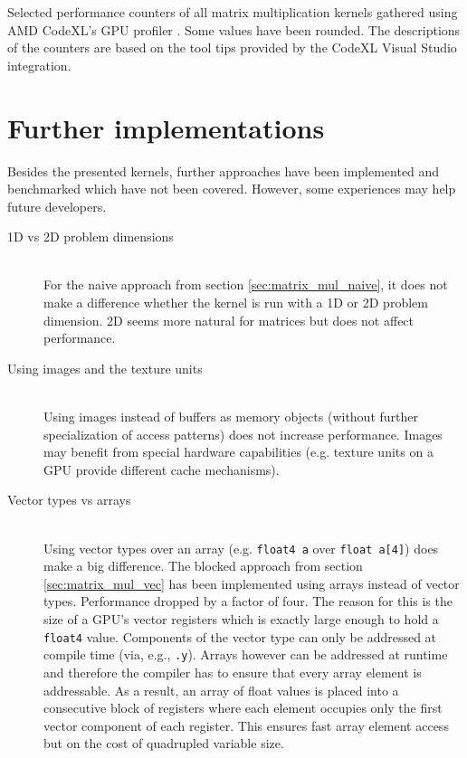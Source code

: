 \begin{table}
	\caption{Selected performance counters of all matrix multiplication kernels gathered using AMD CodeXL's GPU profiler \cite{amd_codexl}. Some values have been rounded. The descriptions of the counters are based on the tool tips provided by the CodeXL Visual Studio integration.}
	\label{tbl:matrix_perf_counter}
\end{table}

\pagebreak

\section{Further implementations}
Besides the presented kernels, further approaches have been implemented and benchmarked which have not been covered. However, some experiences may help future developers.

\begin{description}
	\item[1D vs 2D problem dimensions] \hfill \\
	For the naive approach from section \ref{sec:matrix_mul_naive}, it does not make a difference whether the kernel is run with a 1D or 2D problem dimension. 2D seems more natural for matrices but does not affect performance.

	\item[Using images and the texture units] \hfill \\
	Using images instead of buffers as memory objects (without further specialization of access patterns) does not increase performance. Images may benefit from special hardware capabilities (e.g. texture units on a GPU provide different cache mechanisms).

	\item[Vector types vs arrays] \hfill \\
	Using vector types over an array (e.g. \lstinline!float4 a! over \lstinline!float a[4]!) does make a big difference. The blocked approach from section \ref{sec:matrix_mul_vec} has been implemented using arrays instead of vector types. Performance dropped by a factor of four. The reason for this is the size of a GPU's vector registers which is exactly large enough to hold a \lstinline!float4! value. Components of the vector type can only be addressed at compile time (via, e.g., \lstinline!.y!). Arrays however can be addressed at runtime and therefore the compiler has to ensure that every array element is addressable. As a result, an array of float values is placed into a consecutive block of registers where each element occupies only the first vector component of each register. This ensures fast array element access but on the cost of quadrupled variable size.
\end{description}

